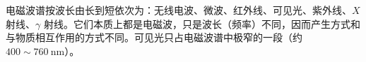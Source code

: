     电磁波谱按波长由长到短依次为：无线电波、微波、红外线、可见光、紫外线、$X$ 射线、$\gamma$ 射线。它们本质上都是电磁波，只是波长（频率）不同，因而产生方式和与物质相互作用的方式不同。可见光只占电磁波谱中极窄的一段（约 $400\sim760\ \mathrm{nm}$）。

